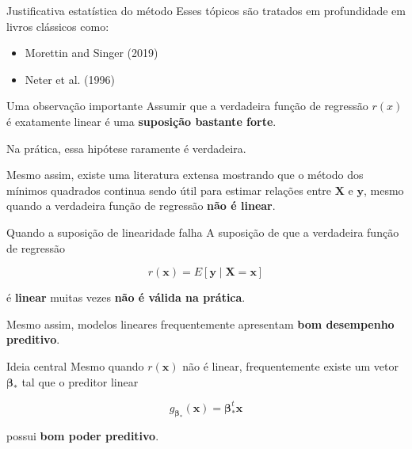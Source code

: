\documentclass[
  ignorenonframetext,
  aspectratio=169,
]{beamer}
\providecommand{\tightlist}{%
  \setlength{\itemsep}{0pt}\setlength{\parskip}{0pt}}
\begin{document}
\begin{frame}
\begin{block}{Justificativa estatística do método}
Esses tópicos são tratados em profundidade em livros clássicos como:

\begin{itemize}
\tightlist
\item
  Morettin and Singer (2019)
\item
  Neter et al. (1996)
\end{itemize}
\end{block}

\begin{block}{Uma observação importante}
\label{uma-observauxe7uxe3o-importante}
Assumir que a verdadeira função de regressão \(r(x)\) é exatamente
linear é uma \textbf{suposição bastante forte}.

Na prática, essa hipótese raramente é verdadeira.

Mesmo assim, existe uma literatura extensa mostrando que o método dos
mínimos quadrados continua sendo útil para estimar relações entre
\(\boldsymbol{X}\) e \(\boldsymbol{y}\), mesmo quando a verdadeira
função de regressão \textbf{não é linear}.
\end{block}
\end{frame}

\begin{frame}{Quando a suposição de linearidade falha}
\label{quando-a-suposiuxe7uxe3o-de-linearidade-falha}
A suposição de que a verdadeira função de regressão

\[
r(\mathbf{x}) = E[\boldsymbol{y} \mid \boldsymbol{X}=\mathbf{x}]
\]

é \textbf{linear} muitas vezes \textbf{não é válida na prática}.

Mesmo assim, modelos lineares frequentemente apresentam \textbf{bom
desempenho preditivo}.
\end{frame}

\begin{frame}
\begin{block}{Ideia central}
\label{ideia-central}
Mesmo quando \(r(\mathbf{x})\) não é linear, frequentemente existe um
vetor \(\boldsymbol{\beta}_*\) tal que o preditor linear

\[
g_{\boldsymbol{\beta}_*}(\mathbf{x}) = \boldsymbol{\beta}_*^t \mathbf{x}
\]

possui \textbf{bom poder preditivo}.
\end{block}
\end{frame}
\end{document}
